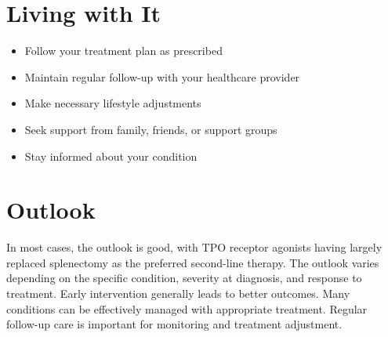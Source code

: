 \section{Living with It}
\begin{itemize}[noitemsep]
  \item Follow your treatment plan as prescribed
  \item Maintain regular follow-up with your healthcare provider
  \item Make necessary lifestyle adjustments
  \item Seek support from family, friends, or support groups
  \item Stay informed about your condition
\end{itemize}
\section{Outlook}
In most cases, the outlook is good, with TPO receptor agonists having largely replaced splenectomy as the preferred second-line therapy. The outlook varies depending on the specific condition, severity at diagnosis, and response to treatment. Early intervention generally leads to better outcomes. Many conditions can be effectively managed with appropriate treatment. Regular follow-up care is important for monitoring and treatment adjustment.
